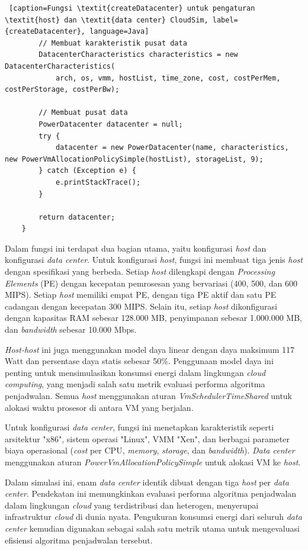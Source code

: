 \begin{lstlisting} [caption=Fungsi \textit{createDatacenter} untuk pengaturan \textit{host} dan \textit{data center} CloudSim, label={createDatacenter}, language=Java]
        // Membuat karakteristik pusat data
        DatacenterCharacteristics characteristics = new DatacenterCharacteristics(
            arch, os, vmm, hostList, time_zone, cost, costPerMem, costPerStorage, costPerBw);

        // Membuat pusat data
        PowerDatacenter datacenter = null;
        try {
            datacenter = new PowerDatacenter(name, characteristics, new PowerVmAllocationPolicySimple(hostList), storageList, 9); 
        } catch (Exception e) {
            e.printStackTrace();
        }

        return datacenter;
    }
\end{lstlisting}

Dalam fungsi ini terdapat dua bagian utama, yaitu konfigurasi \textit{host} dan konfigurasi \textit{data center}. Untuk konfigurasi \textit{host}, fungsi ini membuat tiga jenis \textit{host} dengan spesifikasi yang berbeda. Setiap \textit{host} dilengkapi dengan \textit{Processing Elements} (PE) dengan kecepatan pemrosesan yang bervariasi (400, 500, dan 600 MIPS). Setiap \textit{host} memiliki empat PE, dengan tiga PE aktif dan satu PE cadangan dengan kecepatan 300 MIPS. Selain itu, setiap \textit{host} dikonfigurasi dengan kapasitas RAM sebesar 128.000 MB, penyimpanan sebesar 1.000.000 MB, dan \textit{bandwidth} sebesar 10.000 Mbps.

\textit{Host-host} ini juga menggunakan model daya linear dengan daya maksimum 117 Watt dan persentase daya statis sebesar 50\%. Penggunaan model daya ini penting untuk mensimulasikan konsumsi energi dalam lingkungan \textit{cloud computing}, yang menjadi salah satu metrik evaluasi performa algoritma penjadwalan. Semua \textit{host} menggunakan aturan \textit{VmSchedulerTimeShared} untuk alokasi waktu prosesor di antara VM yang berjalan.

Untuk konfigurasi \textit{data center}, fungsi ini menetapkan karakteristik seperti arsitektur "x86", sistem operasi "Linux", VMM "Xen", dan berbagai parameter biaya operasional (\textit{cost} per CPU, \textit{memory}, \textit{storage}, dan \textit{bandwidth}). \textit{Data center} menggunakan aturan \textit{PowerVmAllocationPolicySimple} untuk alokasi VM ke \textit{host}.

Dalam simulasi ini, enam \textit{data center} identik dibuat dengan tiga \textit{host} per \textit{data center}. Pendekatan ini memungkinkan evaluasi performa algoritma penjadwalan dalam lingkungan \textit{cloud} yang terdistribusi dan heterogen, menyerupai infrastruktur \textit{cloud} di dunia nyata. Pengukuran konsumsi energi dari seluruh \textit{data center} kemudian digunakan sebagai salah satu metrik utama untuk mengevaluasi efisiensi algoritma penjadwalan tersebut.

